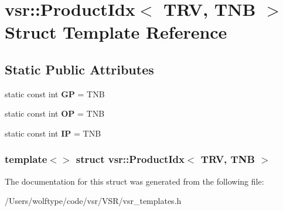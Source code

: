 \hypertarget{structvsr_1_1_product_idx_3_01_t_r_v_00_01_t_n_b_01_4}{\section{vsr\-:\-:Product\-Idx$<$ T\-R\-V, T\-N\-B $>$ Struct Template Reference}
\label{structvsr_1_1_product_idx_3_01_t_r_v_00_01_t_n_b_01_4}
}
\subsection*{Static Public Attributes}
\begin{DoxyCompactItemize}
\item 
\hypertarget{structvsr_1_1_product_idx_3_01_t_r_v_00_01_t_n_b_01_4_a737c2bf742b6fd6bf2b3dbfbb6133a9c}{static const int {\bfseries G\-P} = T\-N\-B}\label{structvsr_1_1_product_idx_3_01_t_r_v_00_01_t_n_b_01_4_a737c2bf742b6fd6bf2b3dbfbb6133a9c}

\item 
\hypertarget{structvsr_1_1_product_idx_3_01_t_r_v_00_01_t_n_b_01_4_a250db10967d6848e8f022625235971cb}{static const int {\bfseries O\-P} = T\-N\-B}\label{structvsr_1_1_product_idx_3_01_t_r_v_00_01_t_n_b_01_4_a250db10967d6848e8f022625235971cb}

\item 
\hypertarget{structvsr_1_1_product_idx_3_01_t_r_v_00_01_t_n_b_01_4_aaaf1156c1831adebb9b5033eae2af5a8}{static const int {\bfseries I\-P} = T\-N\-B}\label{structvsr_1_1_product_idx_3_01_t_r_v_00_01_t_n_b_01_4_aaaf1156c1831adebb9b5033eae2af5a8}

\end{DoxyCompactItemize}
\subsubsection*{template$<$$>$ struct vsr\-::\-Product\-Idx$<$ T\-R\-V, T\-N\-B $>$}



The documentation for this struct was generated from the following file\-:\begin{DoxyCompactItemize}
\item 
/\-Users/wolftype/code/vsr/\-V\-S\-R/vsr\-\_\-templates.\-h\end{DoxyCompactItemize}
